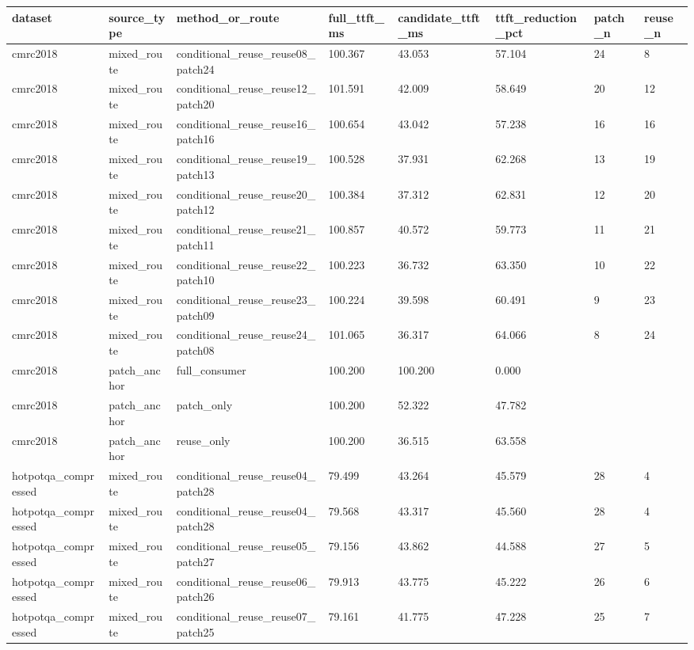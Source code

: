 \begin{tabular}{llllllll}
\toprule
dataset & source\_type & method\_or\_route & full\_ttft\_ms & candidate\_ttft\_ms & ttft\_reduction\_pct & patch\_n & reuse\_n \\
\midrule
cmrc2018 & mixed\_route & conditional\_reuse\_reuse08\_patch24 & 100.367 & 43.053 & 57.104 & 24 & 8 \\
cmrc2018 & mixed\_route & conditional\_reuse\_reuse12\_patch20 & 101.591 & 42.009 & 58.649 & 20 & 12 \\
cmrc2018 & mixed\_route & conditional\_reuse\_reuse16\_patch16 & 100.654 & 43.042 & 57.238 & 16 & 16 \\
cmrc2018 & mixed\_route & conditional\_reuse\_reuse19\_patch13 & 100.528 & 37.931 & 62.268 & 13 & 19 \\
cmrc2018 & mixed\_route & conditional\_reuse\_reuse20\_patch12 & 100.384 & 37.312 & 62.831 & 12 & 20 \\
cmrc2018 & mixed\_route & conditional\_reuse\_reuse21\_patch11 & 100.857 & 40.572 & 59.773 & 11 & 21 \\
cmrc2018 & mixed\_route & conditional\_reuse\_reuse22\_patch10 & 100.223 & 36.732 & 63.350 & 10 & 22 \\
cmrc2018 & mixed\_route & conditional\_reuse\_reuse23\_patch09 & 100.224 & 39.598 & 60.491 & 9 & 23 \\
cmrc2018 & mixed\_route & conditional\_reuse\_reuse24\_patch08 & 101.065 & 36.317 & 64.066 & 8 & 24 \\
cmrc2018 & patch\_anchor & full\_consumer & 100.200 & 100.200 & 0.000 &  &  \\
cmrc2018 & patch\_anchor & patch\_only & 100.200 & 52.322 & 47.782 &  &  \\
cmrc2018 & patch\_anchor & reuse\_only & 100.200 & 36.515 & 63.558 &  &  \\
hotpotqa\_compressed & mixed\_route & conditional\_reuse\_reuse04\_patch28 & 79.499 & 43.264 & 45.579 & 28 & 4 \\
hotpotqa\_compressed & mixed\_route & conditional\_reuse\_reuse04\_patch28 & 79.568 & 43.317 & 45.560 & 28 & 4 \\
hotpotqa\_compressed & mixed\_route & conditional\_reuse\_reuse05\_patch27 & 79.156 & 43.862 & 44.588 & 27 & 5 \\
hotpotqa\_compressed & mixed\_route & conditional\_reuse\_reuse06\_patch26 & 79.913 & 43.775 & 45.222 & 26 & 6 \\
hotpotqa\_compressed & mixed\_route & conditional\_reuse\_reuse07\_patch25 & 79.161 & 41.775 & 47.228 & 25 & 7 \\

\end{tabular}
